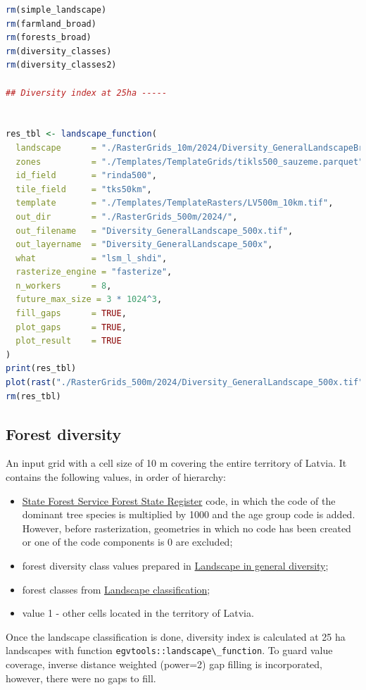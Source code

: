 \documentclass[
]{book}
\newcommand{\passthrough}[1]{#1}
\begin{document}
\begin{lstlisting}[language=R]
rm(simple_landscape)
rm(farmland_broad)
rm(forests_broad)
rm(diversity_classes)
rm(diversity_classes2)

## Diversity index at 25ha -----


res_tbl <- landscape_function(
  landscape      = "./RasterGrids_10m/2024/Diversity_GeneralLandscapeBroad.tif",
  zones          = "./Templates/TemplateGrids/tikls500_sauzeme.parquet",
  id_field       = "rinda500",
  tile_field     = "tks50km",
  template       = "./Templates/TemplateRasters/LV500m_10km.tif",
  out_dir        = "./RasterGrids_500m/2024/",
  out_filename   = "Diversity_GeneralLandscape_500x.tif",
  out_layername  = "Diversity_GeneralLandscape_500x",
  what           = "lsm_l_shdi",
  rasterize_engine = "fasterize",
  n_workers      = 8,
  future_max_size = 3 * 1024^3,
  fill_gaps      = TRUE,
  plot_gaps      = TRUE,
  plot_result    = TRUE
)
print(res_tbl)
plot(rast("./RasterGrids_500m/2024/Diversity_GeneralLandscape_500x.tif"))
rm(res_tbl)
\end{lstlisting}

\subsection{Forest diversity}\label{Ch05.04.02}

An input grid with a cell size of 10 m covering the entire territory of Latvia. It
contains the following values, in order of hierarchy:

\begin{itemize}
\item
  \hyperref[Ch04.01]{State Forest Service Forest State Register} code, in which the
  code of the dominant tree species is multiplied by 1000 and the age group
  code is added. However, before rasterization, geometries in which no code has
  been created or one of the code components is 0 are excluded;
\item
  forest diversity class values prepared in \hyperref[Ch05.04.01]{Landscape in general diversity};
\item
  forest classes from \hyperref[Ch05.03]{Landscape classification};
\item
  value 1 - other cells located in the territory of Latvia.
\end{itemize}

Once the landscape classification is done, diversity index is calculated at 25 ha
landscapes with function \passthrough{\lstinline!egvtools::landscape\_function!}. To guard value coverage,
inverse distance weighted (power=2) gap filling is incorporated, however,
there were no gaps to fill.
\end{document}
